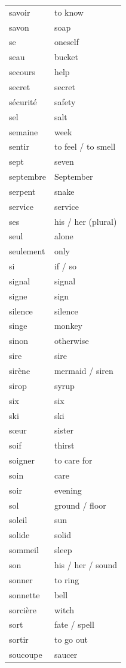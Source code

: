 \documentclass[12pt,a4paper]{article}
\begin{document}
\begin{longtable}{p{4cm} p{6cm}}
savoir & to know \\
savon & soap \\
se & oneself \\
seau & bucket \\
secours & help \\
secret & secret \\
sécurité & safety \\
sel & salt \\
semaine & week \\
sentir & to feel / to smell \\
sept & seven \\
septembre & September \\
serpent & snake \\
service & service \\
ses & his / her (plural) \\
seul & alone \\
seulement & only \\
si & if / so \\
signal & signal \\
signe & sign \\
silence & silence \\
singe & monkey \\
sinon & otherwise \\
sire & sire \\
sirène & mermaid / siren \\
sirop & syrup \\
six & six \\
ski & ski \\
sœur & sister \\
soif & thirst \\
soigner & to care for \\
soin & care \\
soir & evening \\
sol & ground / floor \\
soleil & sun \\
solide & solid \\
sommeil & sleep \\
son & his / her / sound \\
sonner & to ring \\
sonnette & bell \\
sorcière & witch \\
sort & fate / spell \\
sortir & to go out \\
soucoupe & saucer \\

\end{longtable}
\end{document}
